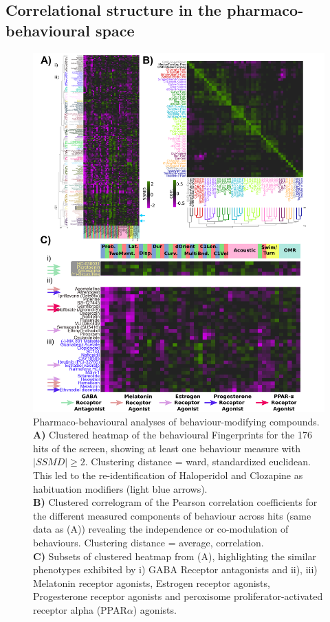 \documentclass[9pt,lineno]{RandlettLab_elife}
\begin{document}
\subsection{Correlational structure in the pharmaco-behavioural space }

\begin{figure}
\begin{fullwidth}
\begin{center}
\includegraphics[width=0.87\linewidth]{Figure_2-ClusterFigure.png}
\caption{
Pharmaco-behavioural analyses of behaviour-modifying compounds. 
\\ \textbf{A)} Clustered heatmap of the behavioural Fingerprints for the 176 hits of the screen, showing at least one behaviour measure with $ |SSMD| \geq 2 $. Clustering distance = ward, standardized euclidean. This led to the re-identification of Haloperidol and Clozapine as habituation modifiers (light blue arrows). 
\\ \textbf{B)} Clustered correlogram of the Pearson correlation coefficients for the different measured components of behaviour across hits (same data as (A)) revealing the independence or co-modulation of behaviours. Clustering distance = average, correlation. 
\\ \textbf{C)} Subsets of clustered heatmap from (A), highlighting the similar phenotypes exhibited by i) GABA Receptor antagonists and ii), iii) Melatonin receptor agonists, Estrogen receptor agonists, Progesterone receptor agonists and peroxisome proliferator-activated receptor alpha (PPAR$\alpha$) agonists. 
}
\label{fig:2}
\end{center}
\end{fullwidth}
\end{figure}
\end{document}
